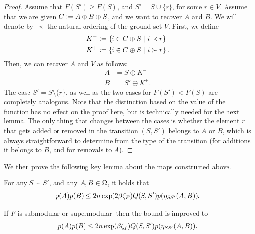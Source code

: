 \begin{proof}
  Assume that $F(S') \geq F(S)$, and $S' = S \cup \{r\}$, for some $r \in V$.
  Assume that we are given $C \defeq A \oplus B \oplus S$, and we want to recover $A$ and $B$.
  We will denote by $\prec$ the natural ordering of the ground set $V$.
  First, we define
  \begin{align*}
    K^- &\defeq \sdef{i \in C \oplus S}{i \prec r}\\
    K^+ &\defeq \sdef{i \in C \oplus S}{i \succ r}.
  \end{align*}
  Then, we can recover $A$ and $V$ as follows:
  \begin{align*}
    A &= S \oplus K^-\\
    B &= S' \oplus K^+.
  \end{align*}
  The case $S' = S \setminus \{r\}$, as well as the two cases for $F(S') < F(S)$ are completely analogous.
  Note that the distinction based on the value of the function has no effect on the proof here, but is technically needed for the next lemma.
  The only thing that changes between the cases is whether the element $r$ that gets added or removed in the transition $(S, S')$ belongs to $A$ or $B$, which is always straightforward to determine from the type of the transition (for additions it belongs to $B$, and for removals to $A$).
\end{proof}
\noindent We then prove the following key lemma about the maps constructed above.
\begin{lemma} \label{lem:poly_full}
  For any $S \sim S'$, and any $A, B \in \ss$, it holds that
  \begin{align*}
    p(A)p(B) \leq 2n\exp(2 \beta \zf)Q(S, S')p(\ess(A, B)).
  \end{align*}
  
  If $F$ is submodular or supermodular, then the bound is improved to
  \begin{align*}
  	p(A)p(B) \leq 2n\exp(\beta \zeta_f)Q(S, S')p(\ess(A, B)).
  \end{align*}
\end{lemma}
